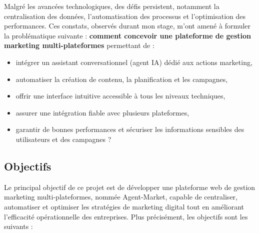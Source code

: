 \documentclass[12pt,a4paper]{report}
\numberwithin{figure}{chapter}
\numberwithin{table}{chapter}
\begin{document}
\vspace{0.3cm}

Malgré les avancées technologiques, des défis persistent, notamment la centralisation des données, l’automatisation des processus et l’optimisation des performances. Ces constats, observés durant mon stage, m’ont amené à formuler la problématique suivante : \textbf{comment concevoir une plateforme de gestion marketing multi-plateformes} permettant de :
\begin{itemize}[leftmargin=2em,itemsep=4pt]
\item intégrer un assistant conversationnel (agent IA) dédié aux actions marketing,
\item automatiser la création de contenu, la planification et les campagnes,
\item offrir une interface intuitive accessible à tous les niveaux techniques,
\item assurer une intégration fiable avec plusieurs plateformes,
\item garantir de bonnes performances et sécuriser les informations sensibles des utilisateurs et des campagnes ?
\end{itemize}

\subsection{Objectifs}

Le principal objectif de ce projet est de développer une plateforme web de gestion marketing multi-plateformes, nommée Agent-Market, capable de centraliser, automatiser et optimiser les stratégies de marketing digital tout en améliorant l’efficacité opérationnelle des entreprises. Plus précisément, les objectifs sont les suivants :
\end{document}
